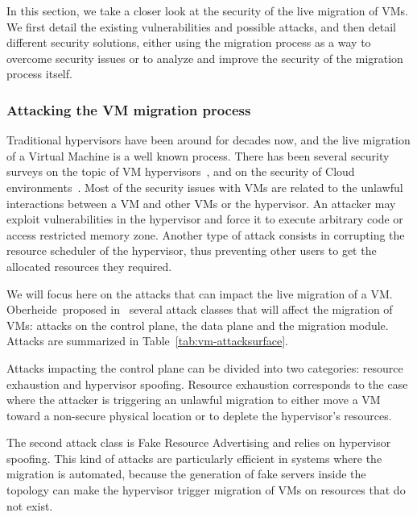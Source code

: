 In this section, we take a closer look at the security of the live migration of VMs.
We first detail the existing vulnerabilities and possible attacks, and then detail different security solutions, either using the migration process as a way to overcome security issues or to analyze and improve the security of the migration process itself.

\subsubsection{Attacking the VM migration process}
Traditional hypervisors have been around for decades now, and the live migration of a Virtual Machine is a well known process. There has been several security surveys on the topic of VM hypervisors~\cite{Reuben2007,Rehman2013,Sahoo2010,Perez-Botero2013}, and on the security of Cloud environments~\cite{cloudenvironmentsecuritysurvey-fernandes2014}.
Most of the security issues with VMs are related to the unlawful interactions between a VM and other VMs or the hypervisor.
An attacker may exploit vulnerabilities in the hypervisor and force it to execute arbitrary code or access restricted memory zone.
Another type of attack consists in corrupting the resource scheduler of the hypervisor, thus preventing other users to get the allocated resources they required.

We will focus here on the attacks that can impact the live migration of a VM.
Oberheide~\etal proposed in~\cite{empirical-oberheide2008} several attack classes that will affect the migration of VMs: attacks on the control plane, the data plane and the migration module.
Attacks are summarized in Table~\ref{tab:vm-attacksurface}.

Attacks impacting the control plane can be divided into two categories: resource exhaustion and hypervisor spoofing. Resource exhaustion corresponds to the case where the attacker is triggering an unlawful migration to either move a VM toward a non-secure physical location or to deplete the hypervisor's resources.

The second attack class is Fake Resource Advertising and relies on hypervisor spoofing. This kind of attacks are particularly efficient in systems where the migration is automated, because the generation of fake servers inside the topology can make the hypervisor trigger migration of VMs on resources that do not exist.

